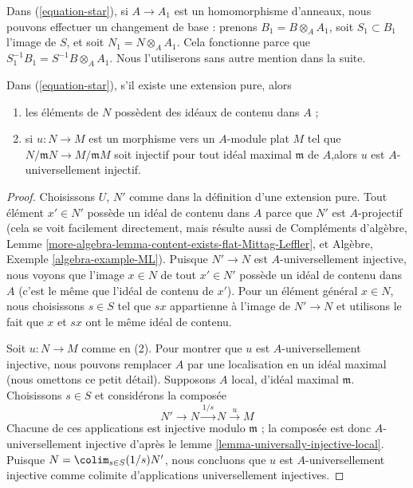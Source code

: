 \medskip\noindent
Dans (\ref{equation-star}), si $A \to A_1$ est un homomorphisme d'anneaux, nous
pouvons effectuer un changement de base : prenons $B_1 = B \otimes_A A_1$, soit
$S_1 \subset B_1$ l'image de $S$, et soit $N_1 = N \otimes_A A_1$. Cela fonctionne
parce que $S_1^{-1}B_1 = S^{-1}B \otimes_A A_1$. Nous l'utiliserons
sans autre mention dans la suite.

\begin{lemma}
\label{lemma-properties-pure-spreadout}
Dans (\ref{equation-star}), s'il existe une extension pure, alors
\begin{enumerate}
\item les éléments de $N$ possèdent des idéaux de contenu dans $A$ ;
\item si $u : N \to M$ est un morphisme vers un $A$-module plat $M$
tel que $N/\mathfrak m N \to M/\mathfrak m M$ soit injectif
pour tout idéal maximal $\mathfrak m$ de $A$,\newline alors $u$ est
$A$-universellement injectif.
\end{enumerate}
\end{lemma}

\begin{proof}
Choisissons $U$, $N'$ comme dans la définition d'une extension pure.
Tout élément $x' \in N'$ possède un idéal de contenu dans $A$ parce que
$N'$ est $A$-projectif (cela se voit facilement directement, mais
résulte aussi de Compléments d'algèbre, Lemme
\ref{more-algebra-lemma-content-exists-flat-Mittag-Leffler}, et
Algèbre, Exemple \ref{algebra-example-ML}).
Puisque $N' \to N$ est $A$-universellement injective, nous voyons que
l'image $x \in N$ de tout $x' \in N'$ possède un idéal de contenu dans $A$
(c'est le même que l'idéal de contenu de $x'$).
Pour un élément général $x \in N$, nous choisissons $s \in S$ tel que
$s x$ appartienne à l'image de $N' \to N$ et utilisons le fait que $x$ et $sx$
ont le même idéal de contenu.

\medskip\noindent
Soit $u : N \to M$ comme en (2). Pour montrer que $u$ est $A$-universellement
injective, nous pouvons remplacer $A$ par une localisation en un idéal maximal
(nous omettons ce petit détail). Supposons $A$ local, d'idéal maximal $\mathfrak m$.
Choisissons $s \in S$ et considérons la composée
$$
N' \to N \xrightarrow{1/s} N \xrightarrow{u} M
$$
Chacune de ces applications est injective modulo $\mathfrak m$ ; la composée
est donc $A$-universellement injective d'après le
lemme \ref{lemma-universally-injective-local}.
Puisque $N = \colim_{s \in S} (1/s)N'$, nous concluons que $u$
est $A$-universellement injective comme colimite d'applications universellement injectives.
\end{proof}

